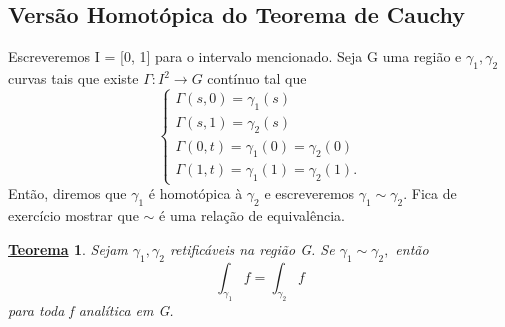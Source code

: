 \documentclass{article}
\newtheorem*{theorem*}{\underline{Teorema}}
\begin{document}
  \subsection{Vers\~ao Homot\'opica do Teorema de Cauchy}
  Escreveremos I = [0, 1] para o intervalo mencionado. Seja G uma regi\~ao e $\gamma_{1}, \gamma_{2}$ curvas tais que existe
 $\Gamma:I^{2}\rightarrow G$ cont\'inuo tal que 
  $$
    \left\{\begin{array}{ll}
        \Gamma(s, 0) = \gamma_{1}(s)\\
        \Gamma(s, 1) = \gamma_{2}(s)\\
        \Gamma(0, t) = \gamma_{1}(0) = \gamma_{2}(0)\\
        \Gamma(1, t) = \gamma_{1}(1) = \gamma_{2}(1).
      \end{array}\right.
  $$
  Ent\~ao, diremos que $\gamma_{1}$ \'e homot\'opica \`a $\gamma_{2}$ e escreveremos $\gamma_{1}\sim\gamma_{2}.$ Fica de exerc\'icio
mostrar que $\sim$ \'e uma rela\c c\~ao de equival\^encia.
 \begin{theorem*}
   Sejam $\gamma_{1}, \gamma_{2}$ retific\'aveis na regi\~ao G. Se $\gamma_{1}\sim \gamma_{2},$ ent\~ao
   $$
    \int_{\gamma_{1}}f = \int_{\gamma_{2}}f
   $$
  para toda f anal\'itica em G. 
 \end{theorem*}
\end{document}
